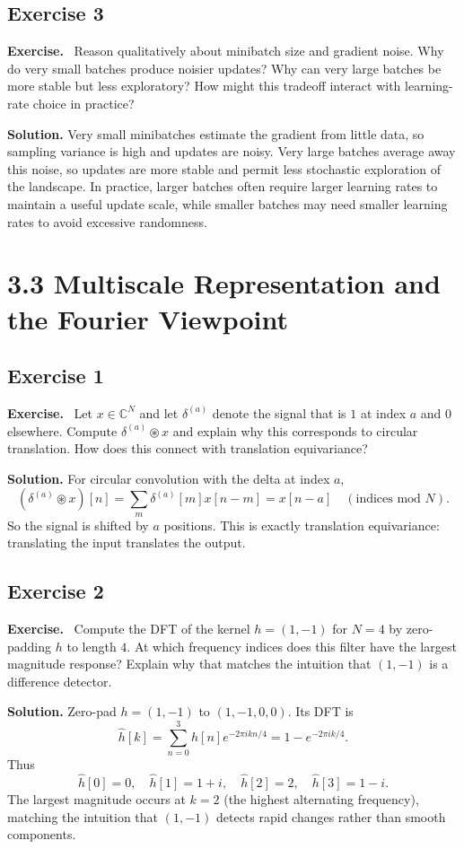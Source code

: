 \documentclass[11pt]{article}
\newenvironment{exercisebox}{\begin{framed}\noindent\textbf{Exercise.}\ }{\end{framed}}
\begin{document}
\subsection*{Exercise 3}
\begin{exercisebox}
Reason qualitatively about minibatch size and gradient noise.
Why do very small batches produce noisier updates?
Why can very large batches be more stable but less exploratory?
How might this tradeoff interact with learning-rate choice in practice?
\end{exercisebox}
\textbf{Solution.} Very small minibatches estimate the gradient from little data, so sampling variance is high and updates are noisy. Very large batches average away this noise, so updates are more stable and permit less stochastic exploration of the landscape. In practice, larger batches often require larger learning rates to maintain a useful update scale, while smaller batches may need smaller learning rates to avoid excessive randomness.

\section{3.3 Multiscale Representation and the Fourier Viewpoint}
\subsection*{Exercise 1}
\begin{exercisebox}
Let $x \in \mathbb{C}^N$ and let $\delta^{(a)}$ denote the signal that is $1$ at index $a$ and $0$ elsewhere.
Compute $\delta^{(a)} \circledast x$ and explain why this corresponds to circular translation.
How does this connect with translation equivariance?
\end{exercisebox}
\textbf{Solution.} For circular convolution with the delta at index $a$,
\[
(\delta^{(a)}\circledast x)[n]=\sum_m \delta^{(a)}[m]x[n-m]=x[n-a]\quad (\text{indices mod }N).
\]
So the signal is shifted by $a$ positions. This is exactly translation equivariance: translating the input translates the output.

\subsection*{Exercise 2}
\begin{exercisebox}
Compute the DFT of the kernel $h=(1,-1)$ for $N=4$ by zero-padding $h$ to length $4$.
At which frequency indices does this filter have the largest magnitude response?
Explain why that matches the intuition that $(1,-1)$ is a difference detector.
\end{exercisebox}
\textbf{Solution.} Zero-pad $h=(1,-1)$ to $(1,-1,0,0)$. Its DFT is
\[
\hat h[k]=\sum_{n=0}^{3} h[n]e^{-2\pi i kn/4}=1-e^{-2\pi i k/4}.
\]
Thus
\[
\hat h[0]=0,\quad \hat h[1]=1+i,\quad \hat h[2]=2,\quad \hat h[3]=1-i.
\]
The largest magnitude occurs at $k=2$ (the highest alternating frequency), matching the intuition that $(1,-1)$ detects rapid changes rather than smooth components.
\end{document}
